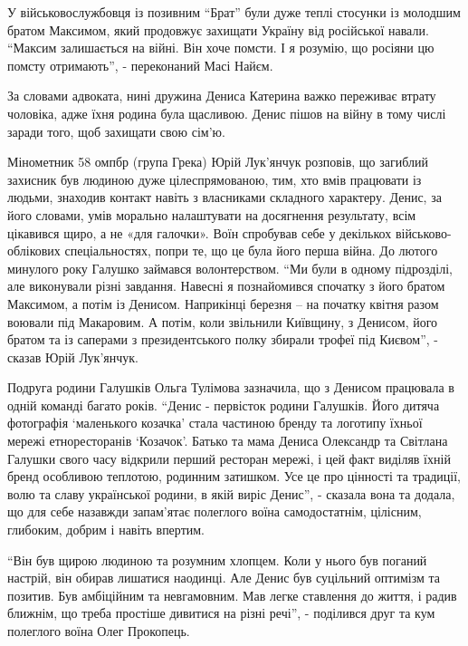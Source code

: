 У військовослужбовця із позивним \enquote{Брат} були дуже теплі стосунки із молодшим
братом Максимом, який продовжує захищати Україну від російської навали. \enquote{Максим
залишається на війні. Він хоче помсти. І я розумію, що росіяни цю помсту
отримають}, - переконаний Масі Найєм.

За словами адвоката, нині дружина Дениса Катерина важко переживає втрату
чоловіка, адже їхня родина була щасливою. Денис пішов на війну в тому числі
заради того, щоб захищати свою сім'ю.


Мінометник 58 омпбр (група Грека) Юрій Лук'янчук розповів, що загиблий захисник
був людиною дуже цілеспрямованою, тим, хто вмів працювати із людьми, знаходив
контакт навіть з власниками складного характеру. Денис, за його словами, умів
морально налаштувати на досягнення результату, всім цікавився щиро, а не «для
галочки». Воїн спробував себе у декількох військово-облікових спеціальностях,
попри те, що це була його перша війна. До лютого минулого року Галушко займався
волонтерством. \enquote{Ми були в одному підрозділі, але виконували різні завдання.
Навесні я познайомився спочатку з його братом Максимом, а потім із Денисом.
Наприкінці березня – на початку квітня разом воювали під Макаровим. А потім,
коли звільнили Київщину, з Денисом, його братом та із саперами з
президентського полку збирали трофеї під Києвом}, - сказав Юрій Лук'янчук.

Подруга родини Галушків Ольга Тулімова зазначила, що з Денисом працювала в
одній команді багато років. \enquote{Денис - первісток родини Галушків. Його дитяча
фотографія \enquote{маленького козачка} стала частиною бренду та логотипу їхньої мережі
етноресторанів \enquote{Козачок}. Батько та мама Дениса Олександр та Світлана Галушки
свого часу відкрили перший ресторан мережі, і цей факт виділяв їхній бренд
особливою теплотою, родинним затишком. Усе це про цінності та традиції, волю та
славу української родини, в якій виріс Денис}, - сказала вона та додала, що для
себе назавжди запам'ятає полеглого воїна самодостатнім, цілісним, глибоким,
добрим і навіть впертим.

\enquote{Він був щирою людиною та розумним хлопцем. Коли у нього був поганий настрій,
він обирав лишатися наодинці. Але Денис був суцільний оптимізм та позитив. Був
амбіційним та невгамовним. Мав легке ставлення до життя, і радив ближнім, що
треба простіше дивитися на різні речі}, - поділився друг та кум полеглого воїна
Олег Прокопець.

